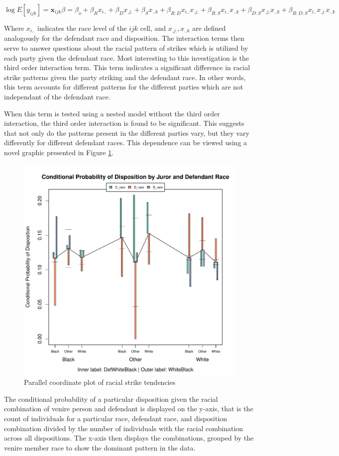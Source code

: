 \documentclass{article}
\begin{document}
$$\log{E[y_{ijk}]} = \textbf{x}_{ijk}\beta = \beta_o + \beta_R x_{i..} + \beta_{D} x_{.j.} + \beta_S x_{..k} + \beta_{R:D}
x_{i..} x_{.j.} + \beta_{R:S} x_{i..} x_{..k} +\beta_{D:S} x_{.j.} x_{..k} + \beta_{R:D:S} x_{i..} x_{.j.} x_{..k}$$

Where $x_{i..}$ indicates the race level of the $ijk$ cell, and $x_{.j.},x_{..k}$ are defined analogously for the defendant race
and disposition. The interaction terms then serve to answer questions about the racial pattern of strikes which is utilized by
each party given the defendant race. Most interesting to this investigation is the third order interaction term. This term
indicates a significant difference in racial strike patterns given the party striking and the defendant race. In other words, this
term accounts for different patterns for the different parties which are not independant of the defendant race.

When this term is tested using a nested model without the third order interaction, the third order interaction is found to be
significant. This suggests that not only do the patterns present in the different parties vary, but they vary differently for
different defendant races. This dependence can be viewed using a novel graphic presented in Figure \ref{fig:raceraceparcoord}.

\begin{figure}[!h]
  \centering
  \includegraphics[width=0.7\linewidth]{Plots/CondDistRaces}
  \caption{Parallel coordinate plot of racial strike tendencies}
  \label{fig:raceraceparcoord}
\end{figure}

The conditional probability of a particular disposition given the racial combination of venire person and defendant is displayed
on the y-axis, that is the count of individuals for a particular race, defendant race, and disposition combination divided by the
number of individuals with the racial combination across all dispositions. The x-axis then displays the combinations, grouped by
the venire member race to show the dominant pattern in the data.
\end{document}
